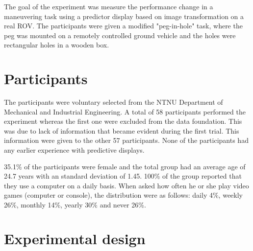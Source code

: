 The goal of the experiment was measure the performance change in a maneuvering task using a predictor display based on image transformation on a real ROV. The participants were given a modified "peg-in-hole" task, where the peg was mounted on a remotely controlled ground vehicle and the holes were rectangular holes in a wooden box.


\section{Participants}

The participants were voluntary selected from the NTNU Department of Mechanical and Industrial Engineering. A total of 58 participants performed the experiment whereas the first one were excluded from the data foundation. This was due to lack of information that became evident during the first trial. This information were given to the other 57 participants. None of the participants had any earlier experience with predictive displays.

35.1\% of the participants were female and the total group had an average age of 24.7 years with an standard deviation of 1.45. 100\% of the group reported that they use a computer on a daily basis. When asked how often he or she play video games (computer or console), the distribution were as follows: daily 4\%, weekly 26\%, monthly 14\%, yearly 30\% and never 26\%.

\section{Experimental design}

